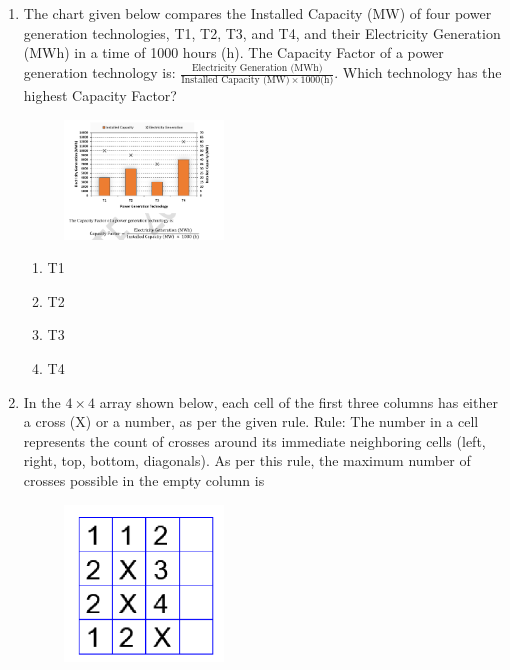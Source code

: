 \documentclass[journal,12pt,onecolumn]{IEEEtran}
\begin{document}
\begin{enumerate}
\item The chart given below compares the Installed Capacity (MW) of four power generation technologies, T1, T2, T3, and T4, and their Electricity Generation (MWh) in a time of 1000 hours (h). The Capacity Factor of a power generation technology is: $\frac{\text{Electricity Generation (MWh)}}{\text{Installed Capacity (MW)} \times 1000 \text{(h)}}$. Which technology has the highest Capacity Factor?

\begin{figure}[h!]
    \centering
    \includegraphics[width=0.4\textwidth]{figs/fig1.png}
    \caption{} 
    \label{fig:q18}
\end{figure}





\hfill{}

\begin{multicols}{4}
\begin{enumerate}
    \item T1
    \item T2
    \item T3
    \item T4
\end{enumerate}
\end{multicols}

\item In the $4 \times 4$ array shown below, each cell of the first three columns has either a cross (X) or a number, as per the given rule. Rule: The number in a cell represents the count of crosses around its immediate neighboring cells (left, right, top, bottom, diagonals). As per this rule, the maximum number of crosses possible in the empty column is

\begin{figure}[h!]
    \centering
    \includegraphics[width=0.4\textwidth]{figs/fig2.png}
    \caption{} 
    \label{fig:q18}
\end{figure}


\end{enumerate}
\end{document}
